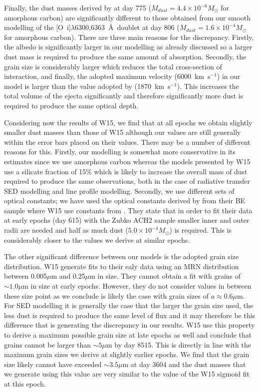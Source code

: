 Finally, the dust masses derived by \citet{Lucy1989b} at day 775 ($M_{dust}=4.4 \times 10^{-6} M_{\odot}$ for amorphous carbon) are significantly different to those obtained from our smooth modelling of the [O~{\sc i}]$\lambda$6300,6363~\AA\ doublet at day 806 ($M_{dust}=1.6 \times 10^{-4} M_{\odot}$ for amorphous carbon).  There are three main reasons for the discrepancy.  Firstly, the albedo is significantly larger in our modelling as already discussed so a larger dust mass is required to produce the same amount of absorption.  Secondly, the grain size is considerably larger which reduces the total cross-section of interaction, and finally, the adopted maximum velocity (6000~km~s$^{-1}$) in our model is larger than the value adopted by \citet{Lucy1989b} (1870~km~s$^{-1}$).  This increases the total volume of the ejecta significantly and therefore significantly more dust is required to produce the same optical depth.



Considering now the results of W15, we find that at all epochs we obtain slightly smaller dust masses than those of W15 although our values are still generally within the error bars 
placed on their values.  There may be a number of different reasons for 
this.  Firstly, our modelling is somewhat more conservative in its 
estimates since we use amorphous carbon whereas the 
models presented by W15 use a silicate fraction of 15\% which is likely to 
increase the overall mass of dust required to produce the same 
observations, both in the case of radiative transfer SED modelling and 
line profile modelling.  Secondly, we use different sets of optical 
constants; we have used the optical constants derived by \cite{Zubko1996} 
from their BE sample where W15 use constants from 
\cite{Hanner1988}.  They state that in order to 
fit their data at early epochs (day 615) with the Zubko ACH2 sample 
smaller inner and outer radii are needed and half as much dust ($5.0 
\times 10^{-4}M_{\odot}$) is required.  This is considerably closer to the 
values we derive at similar epochs.

The other significant difference between our models is the adopted grain 
size distribution.  W15 generate fits to their ealy data using an MRN 
distribution between 0.005$\mu$m and 0.25$\mu$m in size.  They cannot 
obtain a fit with grains of $\sim 1.0 \mu$m in size at early epochs.  
However, they do not consider values in between these size point as we 
conclude is likely the case with grain sizes of $a \approx 0.6\mu$m.  For 
SED modelling it is generally the case that the larger the grain size 
used, the less dust is required to produce the same level of flux and it 
may therefore be this difference that is generating the discrepancy in our 
results.  W15 use this property to derive a maximum possible grain size at 
late epochs as well and conclude that grains cannot be larger than $\sim 
5\mu$m by day 8515.  This is directly in line with the maximum grain sizes 
we derive at slightly earlier epochs.  We find that the grain size likely 
cannot have exceeded $\sim 3.5\mu$m at day 3604 and the dust masses that 
we generate using this value are very similar to the value of the W15 
sigmoid fit at this epoch.


